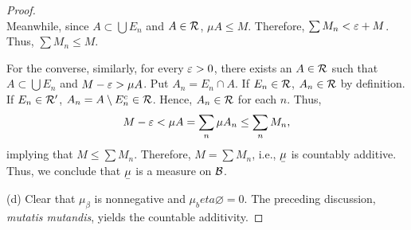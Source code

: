 \begin{proof}
\[    \]
    Meanwhile, since $A\subset\bigcup E_n$ and $A\in\mathcal{R}$, $\mu A\le M$. 
    Therefore, $\sum M_n<\varepsilon+M$. Thus, $\sum M_n\le M$.\par
    For the converse, similarly, for every $\varepsilon>0$, there exists an $A\in
    \mathcal{R}$ such that $A\subset\bigcup E_n$ and $M-\varepsilon>\mu A$. Put $A_n=E_n
    \cap A$. If $E_n\in\mathcal{R}$, $A_n\in\mathcal{R}$ by definition. If $E_n\in
    \mathcal{R}^\prime$, $A_n=A\setminus E_n^c\in\mathcal{R}$. Hence, $A_n\in\mathcal{R}$ for
    each $n$. Thus,
    \[
      M-\varepsilon<\mu A=\sum_n\mu A_n\le\sum_n M_n,
    \]
    implying that $M\le \sum M_n$. Therefore, $M=\sum M_n$, i.e., $\ubar{\mu}$ is
    countably additive. Thus, we conclude that $\ubar{\mu}$ is a measure on
    $\mathcal{B}$.\par
    (d) Clear that $\mu_\beta$ is nonnegative and $\mu_beta\varnothing=0$. The
    preceding discussion, \textit{mutatis mutandis}, yields the countable 
    additivity.
  \end{proof}



